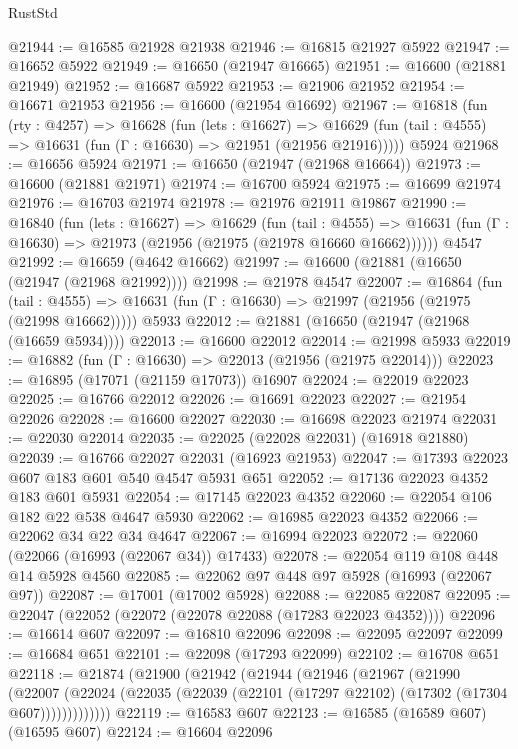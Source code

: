 \begin{lexlean}{RustStd}
\begin{coremodule}
{\begin{coremodule}
{{{{{{{{{{{{{{{{{{{{{{{{{{{{{{{{{{{{{{{{{{{{{{{{{{{{{{{@21944 := @16585 @21928 @21938
@21946 := @16815 @21927 @5922
@21947 := @16652 @5922
@21949 := @16650 (@21947 @16665)
@21951 := @16600 (@21881 @21949)
@21952 := @16687 @5922
@21953 := @21906 @21952
@21954 := @16671 @21953
@21956 := @16600 (@21954 @16692)
@21967 := @16818
    (fun (rty : @4257) =>
    @16628
      (fun (lets : @16627) =>
      @16629 (fun (tail : @4555) => @16631 (fun (Γ : @16630) => @21951 (@21956 @21916)))))
    @5924
@21968 := @16656 @5924
@21971 := @16650 (@21947 (@21968 @16664))
@21973 := @16600 (@21881 @21971)
@21974 := @16700 @5924
@21975 := @16699 @21974
@21976 := @16703 @21974
@21978 := @21976 @21911 @19867
@21990 := @16840
    (fun (lets : @16627) =>
    @16629
      (fun (tail : @4555) =>
      @16631 (fun (Γ : @16630) => @21973 (@21956 (@21975 (@21978 @16660 @16662))))))
    @4547
@21992 := @16659 (@4642 @16662)
@21997 := @16600 (@21881 (@16650 (@21947 (@21968 @21992))))
@21998 := @21978 @4547
@22007 := @16864
    (fun (tail : @4555) => @16631 (fun (Γ : @16630) => @21997 (@21956 (@21975 (@21998 @16662)))))
    @5933
@22012 := @21881 (@16650 (@21947 (@21968 (@16659 @5934))))
@22013 := @16600 @22012
@22014 := @21998 @5933
@22019 := @16882 (fun (Γ : @16630) => @22013 (@21956 (@21975 @22014)))
@22023 := @16895 (@17071 (@21159 @17073)) @16907
@22024 := @22019 @22023
@22025 := @16766 @22012
@22026 := @16691 @22023
@22027 := @21954 @22026
@22028 := @16600 @22027
@22030 := @16698 @22023 @21974
@22031 := @22030 @22014
@22035 := @22025 (@22028 @22031) (@16918 @21880)
@22039 := @16766 @22027 @22031 (@16923 @21953)
@22047 := @17393 @22023 @607 @183 @601 @540 @4547 @5931 @651
@22052 := @17136 @22023 @4352 @183 @601 @5931
@22054 := @17145 @22023 @4352
@22060 := @22054 @106 @182 @22 @538 @4647 @5930
@22062 := @16985 @22023 @4352
@22066 := @22062 @34 @22 @34 @4647
@22067 := @16994 @22023
@22072 := @22060 (@22066 (@16993 (@22067 @34)) @17433)
@22078 := @22054 @119 @108 @448 @14 @5928 @4560
@22085 := @22062 @97 @448 @97 @5928 (@16993 (@22067 @97))
@22087 := @17001 (@17002 @5928)
@22088 := @22085 @22087
@22095 := @22047 (@22052 (@22072 (@22078 @22088 (@17283 @22023 @4352))))
@22096 := @16614 @607
@22097 := @16810 @22096
@22098 := @22095 @22097
@22099 := @16684 @651
@22101 := @22098 (@17293 @22099)
@22102 := @16708 @651
@22118 := @21874
    (@21900
      (@21942
        (@21944
          (@21946
            (@21967
              (@21990
                (@22007
                  (@22024 (@22035 (@22039 (@22101 (@17297 @22102) (@17302 (@17304 @607)))))))))))))
@22119 := @16583 @607
@22123 := @16585 (@16589 @607) (@16595 @607)
@22124 := @16604 @22096
}}}}}}}}}}}}}}}}}}}}}}}}}}}}}}}}}}}}}}}}}}}}}}}}}}}}}}}
\end{coremodule}}
\end{coremodule}
\end{lexlean}
